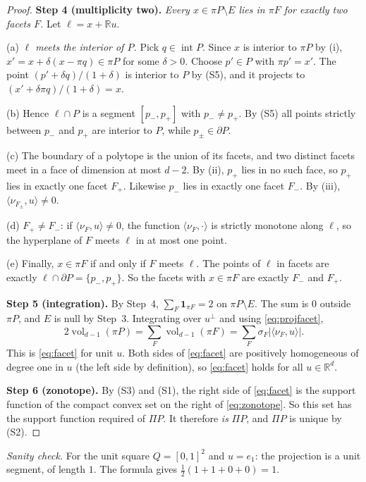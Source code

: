 \documentclass[11pt]{article}
\newcommand{\R}{\mathbb R}
\DeclareMathOperator{\vol}{vol}
\newcommand{\step}[1]{\smallskip\noindent\textbf{#1}}
\begin{document}
\begin{proof}
\step{Step 4 (multiplicity two).} \emph{Every \(x\in\pi P\setminus E\) lies
in \(\pi F\) for exactly two facets \(F\).}
Let \(\ell=x+\R u\).

(a) \emph{\(\ell\) meets the interior of \(P\).} Pick
\(q\in\operatorname{int}P\). Since \(x\) is interior to \(\pi P\) by (i),
\(x'=x+\delta(x-\pi q)\in\pi P\) for some \(\delta>0\). Choose \(p'\in P\)
with \(\pi p'=x'\). The point \((p'+\delta q)/(1+\delta)\) is interior to
\(P\) by (S5), and it projects to \((x'+\delta\pi q)/(1+\delta)=x\).

(b) Hence \(\ell\cap P\) is a segment \([p_-,p_+]\) with \(p_-\ne p_+\).
By (S5) all points strictly between \(p_-\) and \(p_+\) are interior to
\(P\), while \(p_\pm\in\partial P\).

(c) The boundary of a polytope is the union of its facets, and two distinct
facets meet in a face of dimension at most \(d-2\). By (ii), \(p_+\) lies
in no such face, so \(p_+\) lies in exactly one facet \(F_+\). Likewise
\(p_-\) lies in exactly one facet \(F_-\). By (iii),
\(\langle\nu_{F_\pm},u\rangle\ne0\).

(d) \(F_+\ne F_-\): if \(\langle\nu_F,u\rangle\ne0\), the function
\(\langle\nu_F,\cdot\rangle\) is strictly monotone along \(\ell\), so the
hyperplane of \(F\) meets \(\ell\) in at most one point.

(e) Finally, \(x\in\pi F\) if and only if \(F\) meets \(\ell\). The points
of \(\ell\) in facets are exactly \(\ell\cap\partial P=\{p_-,p_+\}\). So
the facets with \(x\in\pi F\) are exactly \(F_-\) and \(F_+\).

\step{Step 5 (integration).} By Step~4, \(\sum_F\mathbf 1_{\pi F}=2\) on
\(\pi P\setminus E\). The sum is \(0\) outside \(\pi P\), and \(E\) is null
by Step~3. Integrating over \(u^\perp\) and using \eqref{eq:projfacet},
\[
 2\vol_{d-1}(\pi P)=\sum_F\vol_{d-1}(\pi F)
 =\sum_F\sigma_F|\langle\nu_F,u\rangle|.
\]
This is \eqref{eq:facet} for unit \(u\). Both sides of \eqref{eq:facet} are
positively homogeneous of degree one in \(u\) (the left side by
definition), so \eqref{eq:facet} holds for all \(u\in\R^d\).

\step{Step 6 (zonotope).} By (S3) and (S1), the right side of
\eqref{eq:facet} is the support function of the compact convex set on the
right of \eqref{eq:zonotope}. So this set has the support function required
of \(\Pi P\). It therefore \emph{is} \(\Pi P\), and \(\Pi P\) is unique by
(S2).
\end{proof}

\emph{Sanity check.} For the unit square \(Q=[0,1]^2\) and \(u=e_1\):
the projection is a unit segment, of length \(1\). The formula gives
\(\tfrac12(1+1+0+0)=1\).
\end{document}
